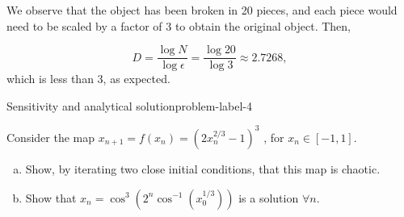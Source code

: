 We observe that the object has been broken in 20 pieces, 
and each piece would need to be scaled by a factor of 3
to obtain the original object. Then,

\[
\boxed{
    D = \frac{\log{N}}{\log{\epsilon}} = \frac{\log{20}}{\log{3}} \approx 2.7268,
}
\]
which is less than 3, as expected.


\begin{problem}{Sensitivity and analytical solution}{problem-label-4}

    Consider the map $x_{n+1} = f(x_n) = (2x_n^{2/3} - 1)^3$ , for $x_n \in [-1, 1]$.

    \begin{enumerate}[(a)]
        \item Show, by iterating two close initial conditions, that this map is chaotic.
        \item Show that $x_n = \cos^3 (2^n \cos^{-1} (x_0^{1/3}))$ is a solution $\forall n$.
    \end{enumerate}

\end{problem}

